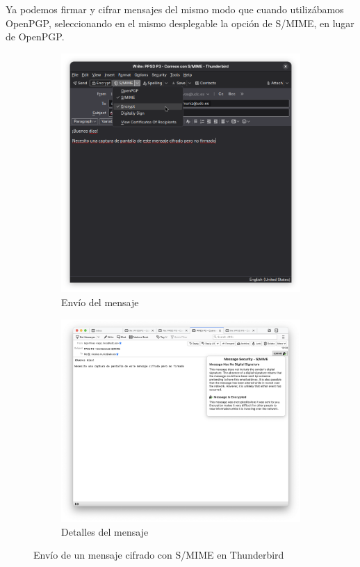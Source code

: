 Ya podemos firmar y cifrar mensajes del mismo modo que cuando utilizábamos OpenPGP, seleccionando en el mismo desplegable la opción de S/MIME, en lugar de OpenPGP.

\begin{figure}[H]
    \centering
    \begin{subfigure}{.5\textwidth}
        \centering
        \includegraphics[width=\linewidth]{thunderbird-smime-cifrado.png}
        \caption{Envío del mensaje}
    \end{subfigure}%
    \begin{subfigure}{.5\textwidth}
        \centering
        \includegraphics[width=\linewidth]{thunderbird-smime-detalles-cifrado.png}
        \caption{Detalles del mensaje}
    \end{subfigure}
    \caption{Envío de un mensaje cifrado con S/MIME en Thunderbird}
\end{figure}

